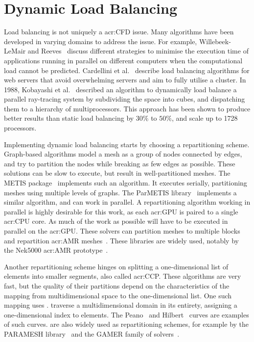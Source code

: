 \section{Dynamic Load Balancing}\label{section:literature_review:load_balancing}

Load balancing is not uniquely a \acrshort{acr:CFD} issue. Many algorithms have been developed in
varying domains to address the issue. For example, Willebeek-LeMair and Reeves~\cite{Willebeek1993}
discuss different strategies to minimise the execution time of applications running in parallel on
different computers when the computational load cannot be predicted. Cardellini et
al.~\cite{Cardellini1999} describe load balancing algorithms for web servers that avoid overwhelming
servers and aim to fully utilise a cluster. In 1988, Kobayashi et al.~\cite{Kobayashi1988} described
an algorithm to dynamically load balance a parallel ray-tracing system by subdividing the space into
cubes, and dispatching them to a hierarchy of multiprocessors. This approach has been shown to
produce better results than static load balancing by \(30 \% \) to \(50 \% \), and scale up to 1728
processors.

Implementing dynamic load balancing starts by choosing a repartitioning scheme. Graph-based
algorithms model a mesh as a group of nodes connected by edges, and try to partition the nodes while
breaking as few edges as possible. These solutions can be slow to execute, but result in
well-partitioned meshes. The METIS package~\cite{Karypis1997} implements such an algorithm. It
executes serially, partitioning meshes using multiple levels of graphs. The ParMETIS
library~\cite{Karypis1997P} implements a similar algorithm, and can work in parallel. A
repartitioning algorithm working in parallel is highly desirable for this work, as each
\acrshort{acr:GPU} is paired to a single \acrshort{acr:CPU} core. As much of the work as possible
will have to be executed in parallel on the \acrshort{acr:GPU}. These solvers can partition meshes
to multiple blocks and repartition \acrshort{acr:AMR} meshes~\cite{Karypis1997P}. These libraries
are widely used, notably by the Nek5000 \acrshort{acr:AMR} prototype~\cite{Peplinski2016}.

Another repartitioning scheme hinges on splitting a one-dimensional list of elements into smaller
segments, also called \acrfull{acr:CCP}. These algorithms are very fast, but the quality of their
partitions depend on the characteristics of the mapping from multidimensional space to the
one-dimensional list. One such mapping uses .  traverse a
multidimensional domain in its entirety, assigning a one-dimensional index to elements. The
Peano~\cite{Peano1890} and Hilbert~\cite{Hilbert1891} curves are examples of such curves.
 are also widely used as repartitioning schemes, for example by the PARAMESH
library~\cite{MacNeice2000} and the GAMER family of solvers~\cite{Schive2018}.

